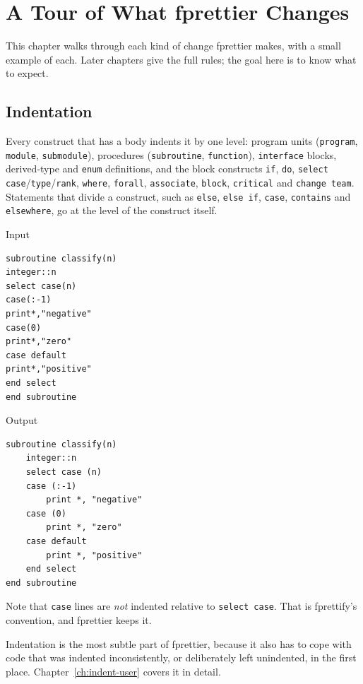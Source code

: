\documentclass[11pt,a4paper,openany]{book}
\newcommand{\code}[1]{\texttt{\small #1}}
\newenvironment{beforecol}{\noindent\begin{minipage}[t]{0.485\linewidth}\textsf{\footnotesize\color{commentc}Input}}{\end{minipage}\hfill}
\newenvironment{aftercol}{\begin{minipage}[t]{0.485\linewidth}\textsf{\footnotesize\color{commentc}Output}}{\end{minipage}\par\medskip}
\begin{document}
\chapter{A Tour of What fprettier Changes}\label{ch:tour}

This chapter walks through each kind of change fprettier makes, with a small
example of each. Later chapters give the full rules; the goal here is to know
what to expect.

\section{Indentation}

Every construct that has a body indents it by one level: program units
(\code{program}, \code{module}, \code{submodule}), procedures
(\code{subroutine}, \code{function}), \code{interface} blocks, derived-type
and \code{enum} definitions, and the block constructs \code{if}, \code{do},
\code{select case}/\code{type}/\code{rank}, \code{where}, \code{forall},
\code{associate}, \code{block}, \code{critical} and \code{change team}.
Statements that divide a construct, such as \code{else}, \code{else if},
\code{case}, \code{contains} and \code{elsewhere}, go at the level of the
construct itself.

\begin{beforecol}
\begin{lstlisting}[style=before]
subroutine classify(n)
integer::n
select case(n)
case(:-1)
print*,"negative"
case(0)
print*,"zero"
case default
print*,"positive"
end select
end subroutine
\end{lstlisting}
\end{beforecol}
\begin{aftercol}
\begin{lstlisting}[style=after]
subroutine classify(n)
    integer::n
    select case (n)
    case (:-1)
        print *, "negative"
    case (0)
        print *, "zero"
    case default
        print *, "positive"
    end select
end subroutine
\end{lstlisting}
\end{aftercol}

Note that \code{case} lines are \emph{not} indented relative to
\code{select case}. That is fprettify's convention, and fprettier keeps it.

Indentation is the most subtle part of fprettier, because it also has to cope
with code that was indented inconsistently, or deliberately left unindented, in
the first place. Chapter~\ref{ch:indent-user} covers it in detail.
\end{document}
